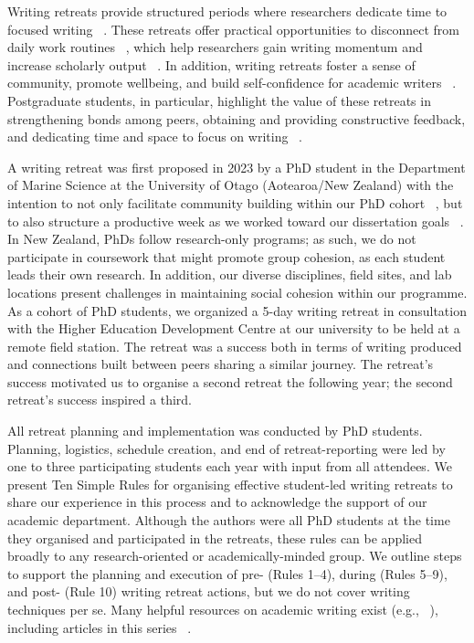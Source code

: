 \documentclass[10pt,letterpaper]{article}
\begin{document}
Writing retreats provide structured periods where researchers dedicate time to focused writing ~\cite{mcgrail2006, murray2009}. These retreats offer practical opportunities to disconnect from daily work routines ~\cite{murray2013, tremblay2021}, which help researchers gain writing momentum and increase scholarly output ~\cite{mcgrail2006, kornhaber2016, quynn2021sustainable}. In addition, writing retreats foster a sense of community, promote wellbeing, and build self-confidence for academic writers ~\cite{kornhaber2016, eardley2021, tremblay2021, quynn2021sustainable}. Postgraduate students, in particular, highlight the value of these retreats in strengthening bonds among peers, obtaining and providing constructive feedback, and dedicating time and space to focus on writing ~\cite{kornhaber2016, papen2018, tremblay2021, bojovic2024}.

A writing retreat was first proposed in 2023 by a PhD student in the Department of Marine Science at the University of Otago (Aotearoa/New Zealand) with the intention to not only facilitate community building within our PhD cohort ~\cite{omeara2017, bernery2022}, but to also structure a productive week as we worked toward our dissertation goals ~\cite{mcgrail2006, kornhaber2016}. In New Zealand, PhDs follow research-only programs; as such, we do not participate in coursework that might promote group cohesion, as each student leads their own research. In addition, our diverse disciplines, field sites, and lab locations present challenges in maintaining social cohesion within our programme. As a cohort of PhD students, we organized a 5-day writing retreat in consultation with the Higher Education Development Centre at our university to be held at a remote field station. The retreat was a success both in terms of writing produced and connections built between peers sharing a similar journey. The retreat's success motivated us to organise a second retreat the following year; the second retreat's success inspired a third.

All retreat planning and implementation was conducted by PhD students. Planning, logistics, schedule creation, and end of retreat-reporting were led by one to three participating students each year with input from all attendees. We present Ten Simple Rules for organising effective student-led writing retreats to share our experience in this process and to acknowledge the support of our academic department. Although the authors were all PhD students at the time they organised and participated in the retreats, these rules can be applied broadly to any research-oriented or academically-minded group. We outline steps to support the planning and execution of pre- (Rules 1--4), during (Rules 5--9), and post- (Rule 10) writing retreat actions, but we do not cover writing techniques per se. Many helpful resources on academic writing exist (e.g., ~\cite{turbek2016, hotaling2020, carter2020, cargill2021}), including articles in this series ~\cite{weinberger2015, mensh2017, peterson2018, drake2025}.
\end{document}
